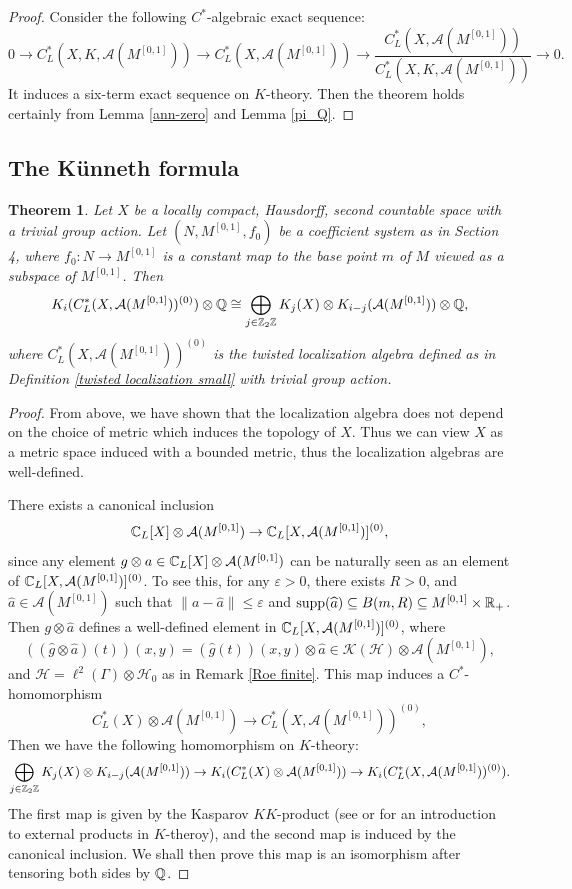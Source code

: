 \documentclass[11pt]{article}
\theoremstyle{definition}
\theoremstyle{plain}
\newtheorem{Thm}[Def]{Theorem}
\def\A{\mathcal A}\def\C{\mathcal C}\def\B{\mathcal B}\def\E{\mathcal E}\def\O{\mathcal O}\def\h{\mathfrak h}\def\K{\mathcal K}\def\F{\mathcal F}\def\P{\mathcal P}\def\L{\mathcal L}\def\R{\mathcal R}\def\Q{\mathcal Q}\def\H{\mathcal H}\def\S{\mathcal S}\def\N{\mathcal N}\def\U{\mathcal U}\def\V{\mathcal V}
\def\supp{\textup{supp}}
\def\ox{\otimes}
\def\wh{\widehat}
\def\ox{\otimes}
\def\Ga{\Gamma}
\begin{document}
\begin{appendices}
\begin{proof}
Consider the following $C^*$-algebraic exact sequence:
$$0\to C^*_L(X,K,\A(M^{[0,1]}))\to C^*_L(X,\A(M^{[0,1]}))\to\frac{C^*_L(X,\A(M^{[0,1]}))}{C^*_L(X,K,\A(M^{[0,1]}))}\to 0.$$
It induces a six-term exact sequence on $K$-theory. Then the theorem holds certainly from Lemma \ref{ann-zero} and Lemma \ref{pi_Q}.
\end{proof}

\subsection*{The K\"unneth formula}

\begin{Thm}\label{kunneth}
Let $X$ be a locally compact, Hausdorff, second countable space with a \emph{trivial group action}. Let $(N,M^{[0,1]},f_0)$ be a coefficient system as in Section 4, where $f_0:N\to M^{[0,1]}$ is a constant map to the base point $m$ of $M$ viewed as a subspace of $M^{[0,1]}$. Then
$$K_i(C^*_L(X,\A(M^{[0,1]}))^{(0)})\ox\IQ\cong \bigoplus_{j\in\IZ_2\IZ}K_j(X)\ox K_{i-j}(\A(M^{[0,1]}))\ox\IQ,$$
where $C^*_L(X,\A(M^{[0,1]}))^{(0)}$ is the twisted localization algebra defined as in Definition \ref{twisted localization small} with trivial group action.
\end{Thm}

\begin{proof}
From above, we have shown that the localization algebra does not depend on the choice of metric which induces the topology of $X$. Thus we can view $X$ as a metric space induced with a bounded metric, thus the localization algebras are well-defined.

There exists a canonical inclusion
$$\IC_L[X]\ox\A(M^{[0,1]})\to\IC_L[X,\A(M^{[0,1]})]^{(0)},$$
since any element $g\ox a\in\IC_L[X]\ox\A(M^{[0,1]})$ can be naturally seen as an element of $\IC_L[X,\A(M^{[0,1]})]^{(0)}$. To see this, for any $\varepsilon>0$, there exists $R>0$, and $\wh a\in\A(M^{[0,1]})$ such that $\|a-\wh a\|\leq \varepsilon$ and $\supp(\wh a)\subseteq B(m,R)\subseteq M^{[0,1]}\times\IR_+$. Then $g\ox\wh a$ defines a well-defined element in $\IC_L[X,\A(M^{[0,1]})]^{(0)}$, where
$$((\wh g\ox\wh a)(t))(x,y)=(\wh g(t))(x,y)\ox\wh a\in\K(\H)\ox\A(M^{[0,1]}),$$
and $\H=\ell^2(\Ga)\ox\H_0$ as in Remark \ref{Roe finite}. This map induces a $C^*$-homomorphism
$$C^*_L(X)\ox\A(M^{[0,1]})\to C^*_L(X,\A(M^{[0,1]}))^{(0)},$$
Then we have the following homomorphism on $K$-theory:
$$\bigoplus_{j\in\IZ_2\IZ}K_j(X)\ox K_{i-j}(\A(M^{[0,1]}))\to K_i(C^*_L(X)\ox\A(M^{[0,1]}))\to K_i(C^*_L(X,\A(M^{[0,1]}))^{(0)}).$$
The first map is given by the Kasparov $KK$-product (see \cite{Kas88} or \cite[Section 2.10]{HIT2020} for an introduction to external products in $K$-theroy), and the second map is induced by the canonical inclusion. We shall then prove this map is an isomorphism after tensoring both sides by $\mathbb Q$.


\end{proof}
\end{appendices}
\end{document}
